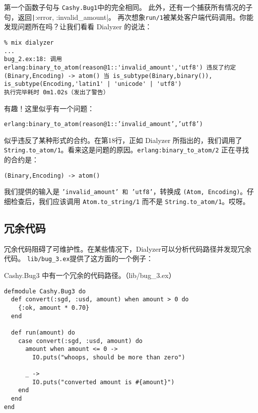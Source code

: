 第一个函数子句与 \texttt{Cashy.Bug1}中的完全相同。
此外，还有一个捕获所有情况的子句，返回\texttt|{:error, :invalid_amount}|。
再次想象\texttt{run/1}被某处客户端代码调用。你能发现问题所在吗？让我们看看 Dialyzer 的说法：

\begin{code}{}
\begin{verbatim}
% mix dialyzer
...
bug_2.ex:18: 调用 erlang:binary_to_atom(reason@1::'invalid_amount','utf8') 违反了约定 (Binary,Encoding) -> atom() 当 is_subtype(Binary,binary()), is_subtype(Encoding,'latin1' | 'unicode' | 'utf8')
执行完毕耗时 0m1.02s（发出了警告）
\end{verbatim}
\end{code}

有趣！这里似乎有一个问题：

\texttt{erlang:binary\_to\_atom(reason@1::'invalid\_amount','utf8')}

似乎违反了某种形式的合约。在第18行，正如 Dialyzer 所指出的，我们调用了
\texttt{String.to\_atom/1}。看来这是问题的原因。\texttt{erlang:binary\_to\_atom/2}
正在寻找的合约是：

\texttt{(Binary,Encoding) -> atom()}

我们提供的输入是
\texttt{'invalid\_amount' 和 'utf8'}，转换成
\texttt{(Atom, Encoding)}。仔细检查后，我们应该调用
\texttt{Atom.to\_string/1} 而不是
\texttt{String.to\_atom/1}。哎呀。

 \subsection{ 冗余代码}

冗余代码阻碍了可维护性。在某些情况下，Dialyzer可以分析代码路径并发现冗余代码。
\texttt{lib/bug\_3.ex}提供了这方面的一个例子：

\begin{code}{Cashy.Bug3 中有一个冗余的代码路径。（lib/bug\_3.ex）}

\begin{verbatim}
defmodule Cashy.Bug3 do
  def convert(:sgd, :usd, amount) when amount > 0 do
    {:ok, amount * 0.70}
  end

  def run(amount) do
    case convert(:sgd, :usd, amount) do
      amount when amount <= 0 ->
        IO.puts("whoops, should be more than zero")

      _ ->
        IO.puts("converted amount is #{amount}")
    end
  end
end
\end{verbatim}
\end{code}


